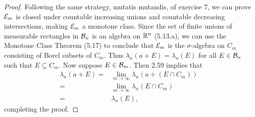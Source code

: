 \begin{proof}
Following the same strategy, mutatis mutandis, of exercise 7, we can prove $\mathcal{E}_m$ is closed under countable increasing unions and countable decreasing intersections, making $\mathcal{E}_m$ a monotone class.
Since the set of finite unions of measurable rectangles in $\mathcal{B}_n$ is an algebra on $\mathbb{R}^n$ (5.13.a), we can use the Monotone Class Theorem (5.17) to conclude that $\mathcal{E}_m$ is the $\sigma$-algebra on $C_m$ consisting of Borel subsets of $C_m$.
Thus $\lambda_n(a + E) = \lambda_n(E)$ for all $E \in \mathcal{B}_n$ such that $E \subseteq C_m$.
Now suppose $E \in \mathcal{B}_m$.
Then 2.59 implies that
\begin{align*}
    \lambda_n(a + E)
    =& \lim_{m \to \infty} \lambda_n(a + (E \cap C_m))\\
    =& \lim_{m \to \infty} \lambda_n(E \cap C_m)\\
    =& \lambda_n(E),
\end{align*}
completing the proof.
\end{proof} 

